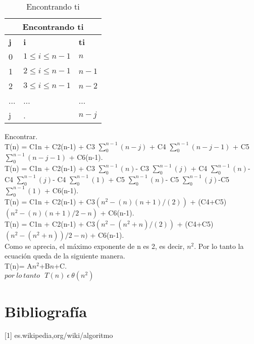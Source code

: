 \documentclass[12pt]{report}
\begin{document}
	\begin{table}[htbp]
		\begin{center}
			\begin{tabular}{|l|l|l|}
				\hline
				\multicolumn{3}{|c|}{Encontrando ti} \\ 
				\hline
				\textbf{j} & \textbf{i} & \textbf{ti}\\
				\hline
				0 & $1 \leq i \leq n-1$ & $n$ \\ \hline
				1 & $2 \leq i \leq n-1$ & $n-1$ \\ \hline
				2 & $3\leq i \leq n-1$ & $n-2$ \\ \hline
				... & ... & ... \\ \hline
				j & . & $n-j$ \\ \hline
			\end{tabular}
			\caption{Encontrando ti}
		\end{center}
	\end{table}

Encontrar.\\
	
T(n) = C1n + C2(n-1) + C3 $\sum_{0}^{n-1}(n-j)$ + C4 $\sum_{0}^{n-1}(n-j-1)$ + C5 $\sum_{0}^{n-1}(n-j-1)$ + C6(n-1).\\

T(n) = C1n + C2(n-1) + C3 $\sum_{0}^{n-1}(n)$- C3 $\sum_{0}^{n-1}(j)$ + C4 $\sum_{0}^{n-1}(n)$- C4 $\sum_{0}^{n-1}(j)$- C4 $\sum_{0}^{n-1}(1)$ + C5 $\sum_{0}^{n-1}(n)$- C5 $\sum_{0}^{n-1}(j)$-C5 $\sum_{0}^{n-1}(1)$ + C6(n-1).\\


T(n) = C1n + C2(n-1) + C3$(n^{2}-(n)(n+1)/(2))$ + (C4+C5) $(n^{2}-(n)(n+1)/2-n)$ + C6(n-1).\\

T(n) = C1n + C2(n-1) + C3$(n^{2}-(n^{2}+n)/(2))$ + (C4+C5) $(n^{2}-(n^{2}+n))/2-n)$ + C6(n-1).\\

Como se aprecia, el máximo exponente de n es 2, es decir, $n^{2}$. Por lo tanto la ecuación queda de la siguiente manera.\\

T(n)= A$n^{2}$+B$n$+C.\\

$ por \ lo \ tanto \ \ \ T(n) \ \epsilon \ \theta (n^{2})$

	\section{Bibliografía}
	
	[1] es.wikipedia,org/wiki/algoritmo
	
\end{document}
